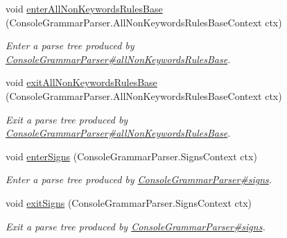 \begin{DoxyCompactItemize}
void \hyperlink{interfacegov_1_1nasa_1_1jpf_1_1inspector_1_1client_1_1parser_1_1_console_grammar_listener_a797884d4b1da3b79b2af3ac1e7e40561}{enter\+All\+Non\+Keywords\+Rules\+Base} (Console\+Grammar\+Parser.\+All\+Non\+Keywords\+Rules\+Base\+Context ctx)
\begin{DoxyCompactList}\small\item\em Enter a parse tree produced by \hyperlink{classgov_1_1nasa_1_1jpf_1_1inspector_1_1client_1_1parser_1_1_console_grammar_parser_a926661be2c5cd242388c918b3de759c3}{Console\+Grammar\+Parser\#all\+Non\+Keywords\+Rules\+Base}. \end{DoxyCompactList}\item 
void \hyperlink{interfacegov_1_1nasa_1_1jpf_1_1inspector_1_1client_1_1parser_1_1_console_grammar_listener_a21fb29a1156800e70ad05bae49d7218c}{exit\+All\+Non\+Keywords\+Rules\+Base} (Console\+Grammar\+Parser.\+All\+Non\+Keywords\+Rules\+Base\+Context ctx)
\begin{DoxyCompactList}\small\item\em Exit a parse tree produced by \hyperlink{classgov_1_1nasa_1_1jpf_1_1inspector_1_1client_1_1parser_1_1_console_grammar_parser_a926661be2c5cd242388c918b3de759c3}{Console\+Grammar\+Parser\#all\+Non\+Keywords\+Rules\+Base}. \end{DoxyCompactList}\item 
void \hyperlink{interfacegov_1_1nasa_1_1jpf_1_1inspector_1_1client_1_1parser_1_1_console_grammar_listener_ab378401f9dbb9afb3f2107872568eff6}{enter\+Signs} (Console\+Grammar\+Parser.\+Signs\+Context ctx)
\begin{DoxyCompactList}\small\item\em Enter a parse tree produced by \hyperlink{classgov_1_1nasa_1_1jpf_1_1inspector_1_1client_1_1parser_1_1_console_grammar_parser_ab04c24317356d7b5f9d1ba1b0a8ed331}{Console\+Grammar\+Parser\#signs}. \end{DoxyCompactList}\item 
void \hyperlink{interfacegov_1_1nasa_1_1jpf_1_1inspector_1_1client_1_1parser_1_1_console_grammar_listener_acc57c725aaa7800ae18ec9e6078421a8}{exit\+Signs} (Console\+Grammar\+Parser.\+Signs\+Context ctx)
\begin{DoxyCompactList}\small\item\em Exit a parse tree produced by \hyperlink{classgov_1_1nasa_1_1jpf_1_1inspector_1_1client_1_1parser_1_1_console_grammar_parser_ab04c24317356d7b5f9d1ba1b0a8ed331}{Console\+Grammar\+Parser\#signs}. \end{DoxyCompactList}\item 

\end{DoxyCompactItemize}
